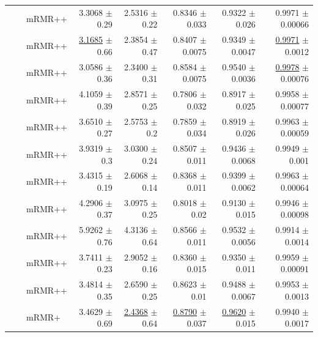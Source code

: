 \begin{longtable}{llp{}rrrrr}
 &  & mRMR++ & 3.3068 {\scriptsize $\pm$ 0.29} & 2.5316 {\scriptsize $\pm$ 0.22} & 0.8346 {\scriptsize $\pm$ 0.033} & 0.9322 {\scriptsize $\pm$ 0.026} & 0.9971 {\scriptsize $\pm$ 0.00066} \\
 &  & mRMR++ & \underline{3.1685} {\scriptsize $\pm$ 0.66} & 2.3854 {\scriptsize $\pm$ 0.47} & 0.8407 {\scriptsize $\pm$ 0.0075} & 0.9349 {\scriptsize $\pm$ 0.0047} & \underline{0.9971} {\scriptsize $\pm$ 0.0012} \\
 &  & mRMR++ & 3.0586 {\scriptsize $\pm$ 0.36} & 2.3400 {\scriptsize $\pm$ 0.31} & 0.8584 {\scriptsize $\pm$ 0.0075} & 0.9540 {\scriptsize $\pm$ 0.0036} & \underline{0.9978} {\scriptsize $\pm$ 0.00076} \\
 &  & mRMR++ & 4.1059 {\scriptsize $\pm$ 0.39} & 2.8571 {\scriptsize $\pm$ 0.25} & 0.7806 {\scriptsize $\pm$ 0.032} & 0.8917 {\scriptsize $\pm$ 0.025} & 0.9958 {\scriptsize $\pm$ 0.00077} \\
 &  & mRMR++ & 3.6510 {\scriptsize $\pm$ 0.27} & 2.5753 {\scriptsize $\pm$ 0.2} & 0.7859 {\scriptsize $\pm$ 0.034} & 0.8919 {\scriptsize $\pm$ 0.026} & 0.9963 {\scriptsize $\pm$ 0.00059} \\
 &  & mRMR++ & 3.9319 {\scriptsize $\pm$ 0.3} & 3.0300 {\scriptsize $\pm$ 0.24} & 0.8507 {\scriptsize $\pm$ 0.011} & 0.9436 {\scriptsize $\pm$ 0.0068} & 0.9949 {\scriptsize $\pm$ 0.001} \\
 &  & mRMR++ & 3.4315 {\scriptsize $\pm$ 0.19} & 2.6068 {\scriptsize $\pm$ 0.14} & 0.8368 {\scriptsize $\pm$ 0.011} & 0.9399 {\scriptsize $\pm$ 0.0062} & 0.9963 {\scriptsize $\pm$ 0.00064} \\
 &  & mRMR++ & 4.2906 {\scriptsize $\pm$ 0.37} & 3.0975 {\scriptsize $\pm$ 0.25} & 0.8018 {\scriptsize $\pm$ 0.02} & 0.9130 {\scriptsize $\pm$ 0.015} & 0.9946 {\scriptsize $\pm$ 0.00098} \\
 &  & mRMR++ & 5.9262 {\scriptsize $\pm$ 0.76} & 4.3136 {\scriptsize $\pm$ 0.64} & 0.8566 {\scriptsize $\pm$ 0.011} & 0.9532 {\scriptsize $\pm$ 0.0056} & 0.9914 {\scriptsize $\pm$ 0.0014} \\
 &  & mRMR++ & 3.7411 {\scriptsize $\pm$ 0.23} & 2.9052 {\scriptsize $\pm$ 0.16} & 0.8360 {\scriptsize $\pm$ 0.015} & 0.9350 {\scriptsize $\pm$ 0.011} & 0.9959 {\scriptsize $\pm$ 0.00091} \\
 &  & mRMR++ & 3.4814 {\scriptsize $\pm$ 0.35} & 2.6590 {\scriptsize $\pm$ 0.25} & 0.8623 {\scriptsize $\pm$ 0.01} & 0.9488 {\scriptsize $\pm$ 0.0067} & 0.9953 {\scriptsize $\pm$ 0.0013} \\
 &  & mRMR+ & 3.4629 {\scriptsize $\pm$ 0.69} & \underline{2.4368} {\scriptsize $\pm$ 0.64} & \underline{0.8790} {\scriptsize $\pm$ 0.037} & \underline{0.9620} {\scriptsize $\pm$ 0.015} & 0.9940 {\scriptsize $\pm$ 0.0017} \\

\end{longtable}
